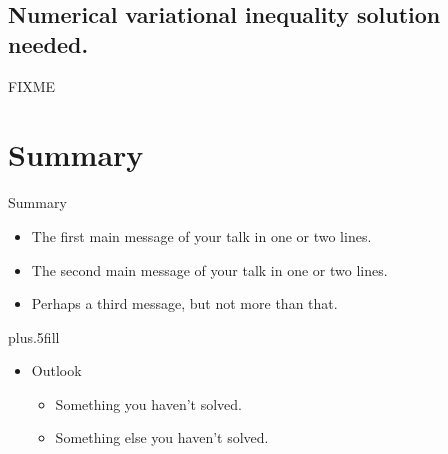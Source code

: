 \documentclass{beamer}
\begin{document}
\subsection{Numerical variational inequality solution needed.}

\begin{frame}{FIXME}
\end{frame}


\section*{Summary}

\begin{frame}{Summary}

  \begin{itemize}
  \item
    The \alert{first main message} of your talk in one or two lines.
  \item
    The \alert{second main message} of your talk in one or two lines.
  \item
    Perhaps a \alert{third message}, but not more than that.
  \end{itemize}
  
  \vskip0pt plus.5fill
  \begin{itemize}
  \item
    Outlook
    \begin{itemize}
    \item
      Something you haven't solved.
    \item
      Something else you haven't solved.
    \end{itemize}
  \end{itemize}
\end{frame}
\end{document}
